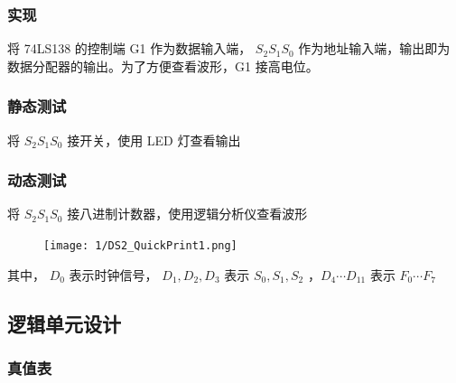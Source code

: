\documentclass{article}
\begin{document}
\subsubsection{实现}

将 74LS138 的控制端 G1 作为数据输入端， $S_2S_1S_0$ 作为地址输入端，输出即为数据分配器的输出。为了方便查看波形，G1 接高电位。

\newpage

\subsubsection{静态测试}

将 $S_2S_1S_0$ 接开关，使用 LED 灯查看输出

\subsubsection{动态测试}

将 $S_2S_1S_0$ 接八进制计数器，使用逻辑分析仪查看波形

\begin{figure}[!hbp]
  \centering
  \texttt{[image: 1/DS2\_QuickPrint1.png]}
\end{figure}

其中， $D_0$ 表示时钟信号， $D_1, D_2, D_3$ 表示 $S_0, S_1, S_2$ ，$D_4 \cdots D_{11}$ 表示 $F_0 \cdots F_7$

\newpage

\subsection{逻辑单元设计}

\subsubsection{真值表}
\end{document}
